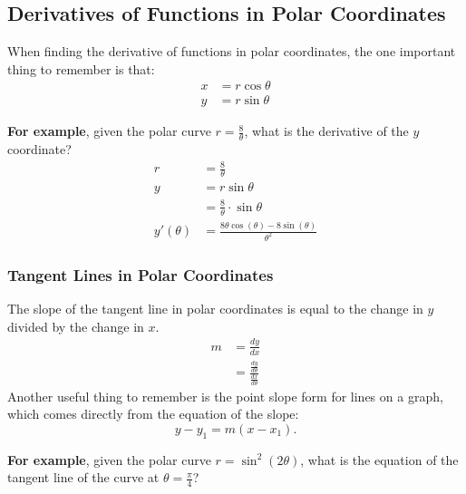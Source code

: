 \documentclass[12pt]{article}
\begin{document}
\subsection{Derivatives of Functions in Polar Coordinates}
When finding the derivative of functions in polar coordinates, the one important thing to remember is that:
\begin{align*}
    x & = r \cos \theta \\
    y & = r \sin \theta
\end{align*}

\noindent \textbf{For example}, given the polar curve $r=\frac{8}{\theta}$, what is the derivative of the $y$ coordinate?
\begin{align*}
    r          & = \frac{8}{\theta}                                        \\[6pt]
    y          & = r \sin \theta                                           \\
               & = \frac{8}{\theta} \cdot \sin \theta                      \\[10pt]
    y'(\theta) & = \frac{8 \theta \cos(\theta) - 8 \sin(\theta)}{\theta^2}
\end{align*}

\subsubsection{Tangent Lines in Polar Coordinates}
The slope of the tangent line in polar coordinates is equal to the change in $y$ divided by the change in $x$.
\begin{align*}
    m & = \frac{dy}{dx}                                 \\[6pt]
      & = \frac{\frac{dy}{d\theta}}{\frac{dx}{d\theta}}
\end{align*}
Another useful thing to remember is the point slope form for lines on a graph, which comes directly from the equation of the slope:
\[ y - y_1 = m(x - x_1). \]

\noindent \textbf{For example}, given the polar curve $r=\sin^2(2\theta)$, what is the equation of the tangent line of the curve at $\theta = \frac{\pi}{4}$?
\end{document}

